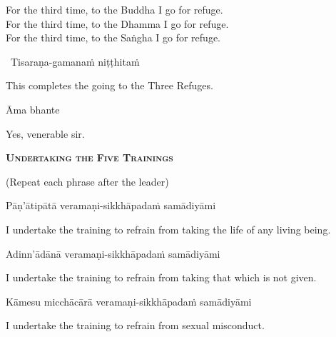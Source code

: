 \begin{english-verses}
  For the third time, to the Buddha I go for refuge.\\
  For the third time, to the Dhamma I go for refuge.\\
  For the third time, to the Saṅgha I go for refuge.
\end{english-verses}

\begin{leader-only}
  \anglebracketleft\ \hspace{-0.5mm}Tisaraṇa-gamanaṁ niṭṭhitaṁ \hspace{-0.5mm}\anglebracketright\
\end{leader-only}

\begin{english}
  This completes the going to the Three Refuges.
\end{english}

Āma bhante

\begin{english}
  Yes, venerable sir.
\end{english}

\clearpage

\begin{center}
  \textbf{\textsc{Undertaking the Five Trainings}}
\end{center}

\begin{center}
  (Repeat each phrase after the leader)
\end{center}

Pāṇ'ātipātā veramaṇi-sikkhāpadaṁ samādiyāmi

\begin{english-hang}
  I undertake the training\makeatletter\hyperlink{endnote139-appendix}\makeatother \thinspace
  to refrain from taking the life of any living being.
\end{english-hang}

Adinn'ādānā veramaṇi-sikkhāpadaṁ samādiyāmi

\begin{english}
  I undertake the training to refrain from taking that which is not given.
\end{english}

Kāmesu micchācārā veramaṇi-sikkhāpadaṁ samādiyāmi

\begin{english}
  I undertake the training to refrain from sexual misconduct.
\end{english}


